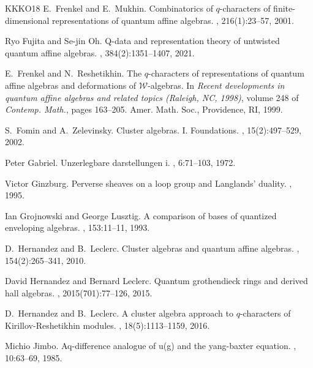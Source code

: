 \documentclass[12pt]{amsart}
\theoremstyle{plain}
\theoremstyle{definition}
\numberwithin{equation}{section}
\begin{document}
\begin{thebibliography}{KKKO18}
E.~Frenkel and E.~Mukhin.
\newblock Combinatorics of {$q$}-characters of finite-dimensional
  representations of quantum affine algebras.
, 216(1):23--57, 2001.

Ryo Fujita and Se-jin Oh.
\newblock Q-data and representation theory of untwisted quantum affine
  algebras.
, 384(2):1351--1407,
  2021.

E.~Frenkel and N.~Reshetikhin.
\newblock The {$q$}-characters of representations of quantum affine algebras
  and deformations of {$\mathscr{W}$}-algebras.
\newblock In {\em Recent developments in quantum affine algebras and related
  topics ({R}aleigh, {NC}, 1998)}, volume 248 of {\em Contemp. Math.}, pages
  163--205. Amer. Math. Soc., Providence, RI, 1999.

S.~Fomin and A.~Zelevinsky.
\newblock Cluster algebras. {I}. {F}oundations.
, 15(2):497--529, 2002.

Peter Gabriel.
\newblock Unzerlegbare darstellungen i.
, 6:71--103, 1972.

Victor Ginzburg.
\newblock Perverse sheaves on a loop group and {L}anglands' duality.
, 1995.

Ian Grojnowski and George Lusztig.
\newblock A comparison of bases of quantized enveloping algebras.
, 153:11--11, 1993.

D.~Hernandez and B.~Leclerc.
\newblock Cluster algebras and quantum affine algebras.
, 154(2):265--341, 2010.

David Hernandez and Bernard Leclerc.
\newblock Quantum grothendieck rings and derived hall algebras.
, 2015(701):77--126, 2015.

D.~Hernandez and B.~Leclerc.
\newblock A cluster algebra approach to {$q$}-characters of
  {K}irillov-{R}eshetikhin modules.
, 18(5):1113--1159, 2016.

Michio Jimbo.
\newblock Aq-difference analogue of u(g) and the yang-baxter equation.
, 10:63--69, 1985.


\end{thebibliography}
\end{document}
